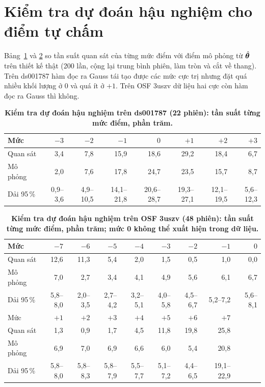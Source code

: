 \section{Kiểm tra dự đoán hậu nghiệm cho điểm tự chấm}
\label{app:ppc}
Bảng~\ref{tab:ppc1} và \ref{tab:ppc2} so tần suất quan sát của từng mức điểm với điểm mô phỏng từ $\hat{\boldsymbol{\theta}}$ trên thiết kế thật (200 lần, cộng lại trung bình phiên, làm tròn và cắt về thang). Trên ds001787 hàm đọc ra Gauss tái tạo được các mức cực trị nhưng đặt quá nhiều khối lượng ở 0 và quá ít ở $+1$. Trên OSF 3uszv dữ liệu hai cực còn hàm đọc ra Gauss thì không.

\begin{table}[t]
\caption{\textbf{Kiểm tra dự đoán hậu nghiệm trên ds001787 (22 phiên): tần suất từng mức điểm, phần trăm.}}
\label{tab:ppc1}
\centering\footnotesize
\setlength{\tabcolsep}{6pt}
\begin{tabular}{lrrrrrrr}
\toprule
Mức & $-3$ & $-2$ & $-1$ & $0$ & $+1$ & $+2$ & $+3$ \\
\midrule
Quan sát   & 3,4 & 7,8 & 15,9 & 18,6 & 29,2 & 18,4 & 6,7 \\
Mô phỏng   & 2,0 & 7,6 & 17,8 & 24,7 & 23,5 & 15,7 & 8,7 \\
Dải 95\,\% & 0,9--3,6 & 4,9--10,5 & 14,1--21,8 & 20,6--28,7 & 19,3--27,1 & 12,1--19,5 & 5,6--12,3 \\
\bottomrule
\end{tabular}
\end{table}

\begin{table}[t]
\caption{\textbf{Kiểm tra dự đoán hậu nghiệm trên OSF 3uszv (48 phiên): tần suất từng mức điểm, phần trăm; mức 0 không thể xuất hiện trong dữ liệu.}}
\label{tab:ppc2}
\centering\footnotesize
\setlength{\tabcolsep}{6pt}
\begin{tabular}{lrrrrrrrr}
\toprule
Mức & $-7$ & $-6$ & $-5$ & $-4$ & $-3$ & $-2$ & $-1$ & $0$ \\
\midrule
Quan sát   & 12,6 & 11,3 & 5,4 & 2,0 & 1,5 & 0,5 & 1,0 & 0,0 \\
Mô phỏng   & 7,0 & 2,7 & 3,4 & 4,1 & 4,9 & 5,6 & 6,1 & 6,7 \\
Dải 95\,\% & 5,8--8,0 & 2,0--3,5 & 2,7--4,2 & 3,2--5,1 & 4,0--5,8 & 4,5--6,7 & 5,2--7,2 & 5,6--8,1 \\
\midrule
Mức & $+1$ & $+2$ & $+3$ & $+4$ & $+5$ & $+6$ & $+7$ & \\
\midrule
Quan sát   & 1,3 & 0,9 & 1,7 & 4,5 & 11,8 & 19,8 & 25,8 & \\
Mô phỏng   & 6,9 & 7,0 & 6,9 & 6,6 & 6,0 & 5,4 & 20,8 & \\
Dải 95\,\% & 5,8--8,0 & 5,8--8,3 & 5,8--7,9 & 5,5--7,7 & 5,1--7,2 & 4,4--6,5 & 19,1--22,9 & \\
\bottomrule
\end{tabular}
\end{table}

